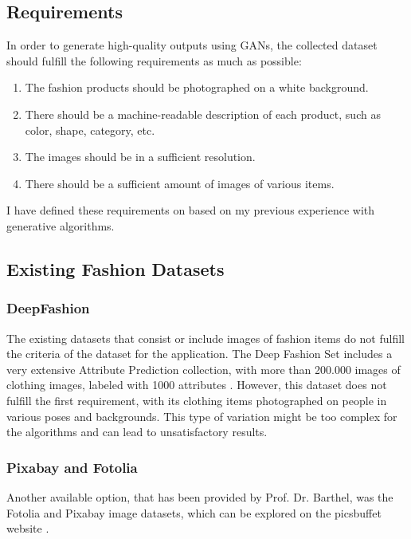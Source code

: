 \documentclass{article}
\begin{document}
\subsection {Requirements}
In order to generate high-quality outputs using GANs, the collected dataset should fulfill the following requirements as much as possible:
\begin{enumerate}
\item The fashion products should be photographed on a white background.
\item There should be a machine-readable description of each product, such as color, shape, category, etc.
\item The images should be in a sufficient resolution.
\item There should be a sufficient amount of images of various items.

\end{enumerate}
I have defined these requirements on based on my previous experience with generative algorithms. 

\subsection {Existing Fashion Datasets}

\subsubsection{DeepFashion}
The existing datasets that consist or include images of fashion items do not fulfill the criteria of the dataset for the application. The Deep Fashion Set includes a very extensive Attribute Prediction collection, with more than 200.000 images of clothing images, labeled with 1000 attributes \cite{the_chinese_university_of_hong_kong_deepfashion_nodate}. However, this dataset does not fulfill the first requirement, with its clothing items photographed on people in various poses and backgrounds. This type of variation might be too complex for the algorithms and can lead to unsatisfactory results.

\subsubsection{Pixabay and Fotolia}
Another available option, that has been provided by Prof. Dr. Barthel, was the Fotolia and Pixabay image datasets, which can be explored on the picsbuffet website \cite{noauthor_picsbuffet_nodate}.
\end{document}
